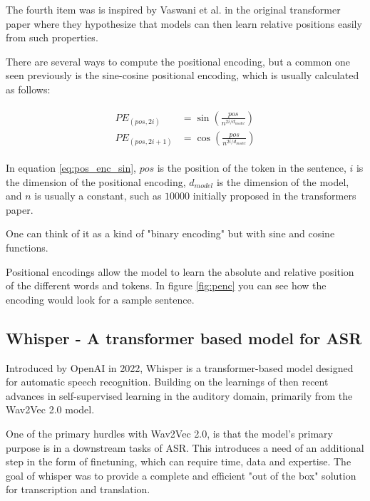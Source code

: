 The fourth item was is inspired by Vaswani et al. in the original transformer paper where they hypothesize that models can then learn relative positions easily from such properties\cite{vaswani_attention_2017}.

There are several ways to compute the positional encoding, but a common one seen previously is the sine-cosine positional encoding, which is usually calculated as follows:

\begin{align}
    \begin{split}
        PE_{(pos, 2i)} &= \sin\left(\frac{pos}{n^{2i/d_{model}}}\right) \\
        PE_{(pos, 2i+1)} &= \cos\left(\frac{pos}{n^{2i/d_{model}}}\right)
    \end{split}
    \label{eq:pos_enc_sin}
\end{align}

In equation \ref{eq:pos_enc_sin}, $pos$ is the position of the token in the sentence, $i$ is the dimension of the positional encoding, $d_{model}$ is the dimension of the model, and $n$ is usually a constant, such as $10000$ initially proposed in the transformers paper\cite{vaswani_attention_2017}.

One can think of it as a kind of "binary encoding" but with sine and cosine functions. 

Positional encodings allow the model to learn the absolute and relative position of the different words and tokens. In figure \ref{fig:penc} you can see how the encoding would look for a sample sentence.



\subsection{Whisper - A transformer based model for ASR}

Introduced by OpenAI in 2022, Whisper is a transformer-based model designed for automatic speech recognition. Building on the learnings of then recent advances in self-supervised learning in the auditory domain, primarily from the Wav2Vec 2.0 model. \cite{radford_robust_2022}

One of the primary hurdles with Wav2Vec 2.0, is that the model's primary purpose is in a downstream tasks of ASR. This introduces a need of an additional step in the form of finetuning, which can require time, data and expertise. The goal of whisper was to provide a complete and efficient "out of the box" solution for transcription and translation.

